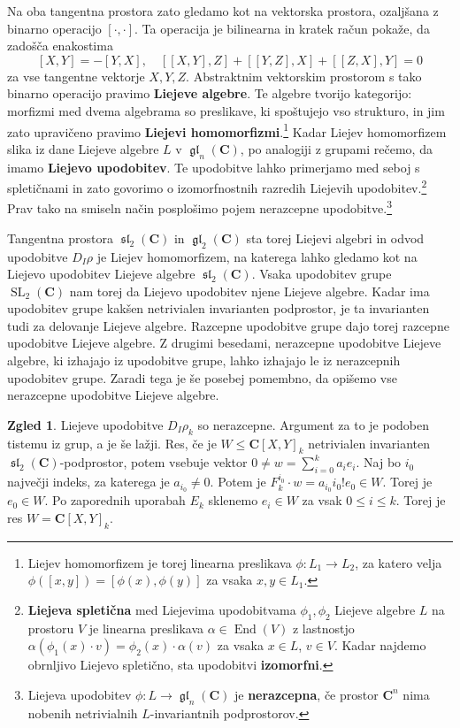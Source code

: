 \documentclass[11pt]{book}
\def\CC{\mathbf{C}}
\DeclareMathOperator\glfrak{\mathfrak{gl}}
\DeclareMathOperator\slfrak{\mathfrak{sl}}
\DeclareMathOperator\SL{SL}
\DeclareMathOperator\End{End}
\def\definicija{\color{rdeca}\bf}
\theoremstyle{definition}
\theoremstyle{zgled}
\newtheorem{zgled}[theorem]{Zgled}
\theoremstyle{zgledbrezstevilke}
\theoremstyle{odprtproblem}
\theoremstyle{domacanaloga}
\theoremstyle{izrek}
\begin{document}
Na oba tangentna prostora zato gledamo kot na vektorska prostora, ozaljšana z binarno operacijo $[\cdot, \cdot]$. Ta operacija je bilinearna in kratek račun pokaže, da zadošča enakostima
\[
    [X,Y] = -[Y,X], \quad [[X,Y], Z] + [[Y,Z], X] + [[Z,X], Y] = 0
\]
za vse tangentne vektorje $X,Y,Z$. Abstraktnim vektorskim prostorom s tako binarno operacijo pravimo {\definicija Liejeve algebre}. Te algebre tvorijo kategorijo: morfizmi med dvema algebrama so preslikave, ki spoštujejo vso strukturo, in jim zato upravičeno pravimo {\definicija Liejevi homomorfizmi}.\footnote{Liejev homomorfizem je torej linearna preslikava $\phi \colon L_1 \to L_2$, za katero velja $\phi([x,y]) = [\phi(x), \phi(y)]$ za vsaka $x,y \in L_1$.} Kadar Liejev homomorfizem slika iz dane Liejeve algebre $L$ v $\glfrak_n(\CC)$, po analogiji z grupami rečemo, da imamo {\definicija Liejevo upodobitev}. Te upodobitve lahko primerjamo med seboj s spletičnami in zato govorimo o izomorfnostnih razredih Liejevih upodobitev.\footnote{{\definicija Liejeva spletična} med Liejevima upodobitvama $\phi_1, \phi_2$ Liejeve algebre $L$ na prostoru $V$ je linearna preslikava $\alpha \in \End(V)$ z lastnostjo $\alpha(\phi_1(x) \cdot v) = \phi_2(x) \cdot \alpha(v)$ za vsaka $x \in L$, $v \in V$. Kadar najdemo obrnljivo Liejevo spletično, sta upodobitvi {\definicija izomorfni}.} Prav tako na smiseln način posplošimo pojem nerazcepne upodobitve.\footnote{Liejeva upodobitev $\phi \colon L \to \glfrak_n(\CC)$ je {\definicija nerazcepna}, če prostor $\CC^n$ nima nobenih netrivialnih $L$-invariantnih podprostorov.}

Tangentna prostora $\slfrak_2(\CC)$ in $\glfrak_2(\CC)$ sta torej Liejevi algebri in odvod upodobitve $D_I \rho$ je Liejev homomorfizem, na katerega lahko gledamo kot na Liejevo upodobitev Liejeve algebre $\slfrak_2(\CC)$. Vsaka upodobitev grupe $\SL_2(\CC)$ nam torej da Liejevo upodobitev njene Liejeve algebre. Kadar ima upodobitev grupe kakšen netrivialen invarianten podprostor, je ta invarianten tudi za delovanje Liejeve algebre. Razcepne upodobitve grupe dajo torej razcepne upodobitve Liejeve algebre. Z drugimi besedami, nerazcepne upodobitve Liejeve algebre, ki izhajajo iz upodobitve grupe, lahko izhajajo le iz nerazcepnih upodobitev grupe. Zaradi tega je še posebej pomembno, da opišemo vse nerazcepne upodobitve Liejeve algebre.

\begin{zgled}
Liejeve upodobitve $D_I \rho_k$ so nerazcepne. Argument za to je podoben tistemu iz grup, a je še lažji. Res, če je $W \leq \CC[X,Y]_k$ netrivialen invarianten $\slfrak_2(\CC)$-podprostor, potem vsebuje vektor $0 \neq w = \sum_{i = 0}^k a_i e_i$. Naj bo $i_0$ največji indeks, za katerega je $a_{i_0} \neq 0$. Potem je $    F_k^{i_0} \cdot w = a_{i_0} i_0! e_0 \in W$. Torej je $e_0 \in W$. Po zaporednih uporabah $E_k$ sklenemo $e_i \in W$ za vsak $0 \leq i \leq k$. Torej je res $W = \CC[X,Y]_k$.
\end{zgled}
\end{document}
